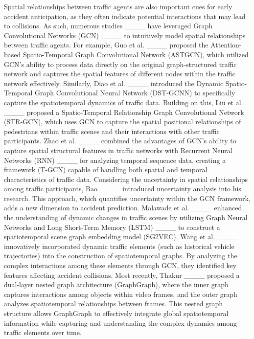 Spatial relationships between traffic agents are also important cues for early accident anticipation, as they often indicate potential interactions that may lead to collisions. As such, numerous studies ____ have leveraged Graph Convolutional Networks (GCN) ____ to intuitively model spatial relationships between traffic agents. For example, Guo et al. ____ proposed the Attention-based Spatio-Temporal Graph Convolutional Network (ASTGCN), which utilized GCN's ability to process data directly on the original graph-structured traffic network and captures the spatial features of different nodes within the traffic network effectively. Similarly, Diao et al. ____ introduced the Dynamic Spatio-Temporal Graph Convolutional Neural Network (DST-GCNN) to specifically capture the spatiotemporal dynamics of traffic data. Building on this, Liu et al. ____ proposed a Spatio-Temporal Relationship Graph Convolutional Network (STR-GCN), which uses GCN to capture the spatial positional relationships of pedestrians within traffic scenes and their interactions with other traffic participants. Zhao et al. ____ combined the advantages of GCN's ability to capture spatial structural features in traffic networks with Recurrent Neural Networks (RNN) ____ for analyzing temporal sequence data, creating a framework (T-GCN) capable of handling both spatial and temporal characteristics of traffic data. Considering the uncertainty in spatial relationships among traffic participants, Bao ____ introduced uncertainty analysis into his research. This approach, which quantifies uncertainty within the GCN framework, adds a new dimension to accident prediction. Malawade et al. ____ enhanced the understanding of dynamic changes in traffic scenes by utilizing Graph Neural Networks and Long Short-Term Memory (LSTM) ____ to construct a spatiotemporal scene graph embedding model (SG2VEC). Wang et al. ____ innovatively incorporated dynamic traffic elements (such as historical vehicle trajectories) into the construction of spatiotemporal graphs. By analyzing the complex interactions among these elements through GCN, they identified key features affecting accident collisions. Most recently, Thakur ____ proposed a dual-layer nested graph architecture (GraphGraph), where the inner graph captures interactions among objects within video frames, and the outer graph analyzes spatiotemporal relationships between frames. This nested graph structure allows GraphGraph to effectively integrate global spatiotemporal information while capturing and understanding the complex dynamics among traffic elements over time.

